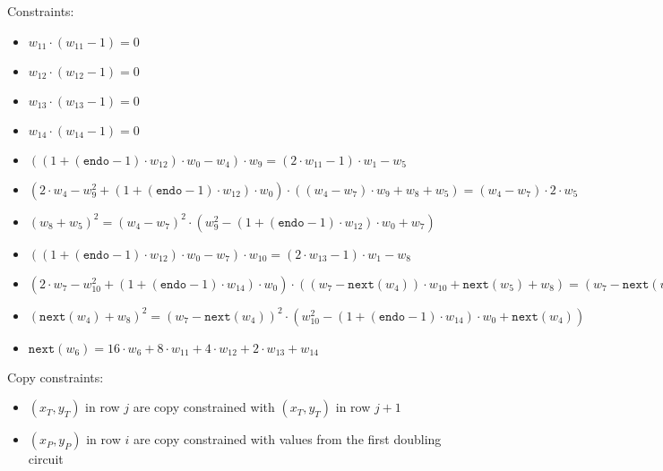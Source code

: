 Constraints:
\begin{itemize}
    \item $w_{11} \cdot (w_{11} - 1) = 0$
    \item $w_{12} \cdot (w_{12} - 1) = 0$
    \item $w_{13} \cdot (w_{13} - 1) = 0$
    \item $w_{14} \cdot (w_{14} - 1) = 0$
    \item $((1 + (\texttt{endo} - 1) \cdot w_{12}) \cdot w_{0} - w_{4}) \cdot w_{9} = (2 \cdot w_{11} - 1) \cdot w_{1} - w_{5}$
    \item $(2 \cdot w_{4} - w_{9}^2 + (1 + (\texttt{endo} - 1) \cdot w_{12}) \cdot w_{0}) \cdot ((w_{4} - w_{7}) \cdot w_{9} + w_{8} + w_{5}) = (w_{4} - w_{7}) \cdot 2 \cdot w_{5}$
    \item $(w_{8} + w_{5})^2 = (w_{4} - w_{7})^2 \cdot (w_{9}^2 - (1 + (\texttt{endo} - 1) \cdot w_{12}) \cdot w_{0} + w_{7})$
    \item $((1 + (\texttt{endo} - 1) \cdot w_{12}) \cdot w_{0} - w_{7}) \cdot w_{10} = (2 \cdot w_{13}-1) \cdot w_{1} - w_{8}$
    \item $(2 \cdot w_{7} - w_{10}^2 + (1 + (\texttt{endo} - 1) \cdot w_{14}) \cdot w_{0}) \cdot ((w_{7} - \texttt{next}(w_{4})) \cdot w_{10} + \texttt{next}(w_{5}) + w_{8}) = (w_{7} - \texttt{next}(w_{4})) \cdot 2 \cdot w_{8}$
    \item $(\texttt{next}(w_{4}) + w_{8})^2 = (w_{7} - \texttt{next}(w_{4}))^2 \cdot (w_{10}^2 - (1 + (\texttt{endo} - 1) \cdot w_{14}) \cdot w_{0} + \texttt{next}(w_{4}))$
    \item $\texttt{next}(w_{6}) = 16 \cdot w_{6} + 8 \cdot w_{11} + 4 \cdot w_{12} + 2 \cdot w_{13} + w_{14}$
\end{itemize}

    Copy constraints:
    \begin{itemize}
    \item $(x_T,y_T)$ in row $j$ are copy constrained with $(x_T,y_T)$ in row $j + 1$
    \item $(x_P,y_P)$ in row $i$ are copy constrained with values from the first doubling circuit
    \end{itemize}
